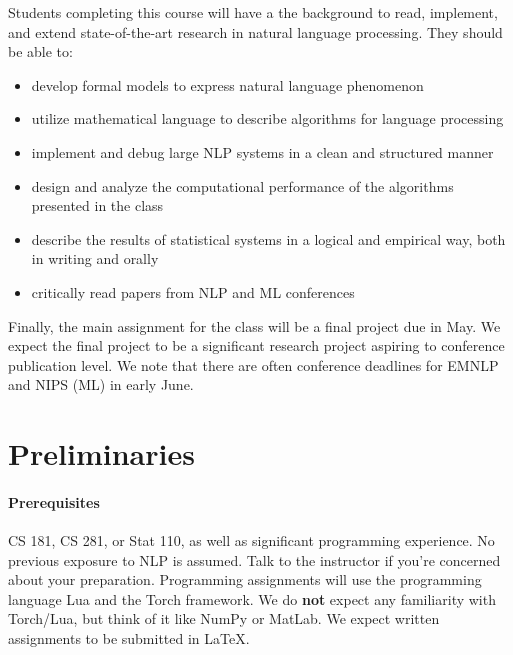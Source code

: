 \documentclass[11pt]{article}
\begin{document}
Students completing this course will have a the background to read,
implement, and extend state-of-the-art research in natural language
processing. They should be able to:


\begin{itemize}
\item develop formal models to express natural language phenomenon
\item utilize mathematical language to describe algorithms for
  language processing
\item implement and debug large NLP systems in a clean and structured
  manner
\item design and analyze the computational performance of the algorithms presented in the class  
\item describe the results of statistical systems in a logical and
  empirical way, both in writing and orally
\item critically read papers from NLP and ML conferences
\end{itemize} 

Finally, the main assignment for the class will be a final project due
in May.  We expect the final project to be a significant research
project aspiring to conference publication level. We note that there 
are often conference deadlines for EMNLP and NIPS (ML) in early June. 

\section{Preliminaries} 

\paragraph{Prerequisites}

CS 181, CS 281, or Stat 110, as well as significant programming
experience.  No previous exposure to NLP is assumed. Talk to the
instructor if you're concerned about your preparation.  Programming
assignments will use the programming language Lua and the Torch
framework. We do \textbf{not} expect any familiarity with Torch/Lua,
but think of it like NumPy or MatLab. We expect written assignments to
be submitted in LaTeX.
\end{document}

